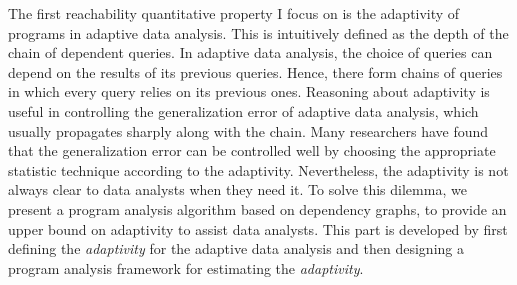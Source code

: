 \begin{abstractpage}
The first reachability quantitative property
 I focus on is the adaptivity of programs in adaptive data analysis.
 This is intuitively defined as the depth of the chain of dependent queries. 
 In adaptive data analysis, the choice of queries can depend on the results of its previous queries. 
 Hence, there form chains of queries in which every query relies on its previous ones.
 Reasoning about adaptivity is useful in controlling the generalization error of adaptive data analysis, which usually propagates sharply along with the chain. 
 Many researchers have found that the generalization error can be controlled well by choosing the appropriate statistic technique according to the adaptivity.
 Nevertheless, the adaptivity is not always clear to data analysts when they need it. 
To solve this dilemma, we present a program analysis algorithm based on dependency graphs,
to provide an upper bound on adaptivity to assist data analysts.
This part is developed by first defining the \emph{adaptivity} for 
 the adaptive data analysis
 and then designing
 a program analysis framework for estimating the \emph{adaptivity}.




\end{abstractpage}
